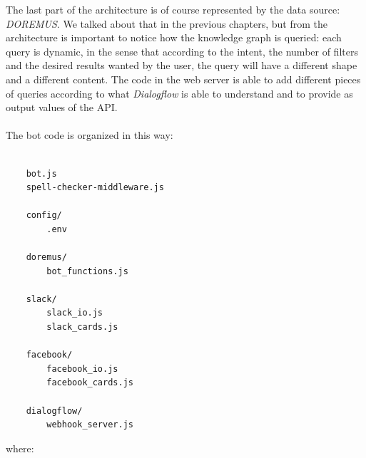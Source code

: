 \documentclass[a4paper,12pt]{report}
\begin{document}
	The last part of the architecture is of course represented by the data source: \textit{DOREMUS}. We talked about that in the previous chapters, but from the architecture is important to notice how the knowledge graph is queried: each query is dynamic, in the sense that according to the intent, the number of filters and the desired results wanted by the user, the query will have a different shape and a different content. The code in the web server is able to add different pieces of queries according to what \textit{Dialogflow} is able to understand and to provide as output values of the API.\\\\
	The bot code is organized in this way:
	\begin{lstlisting}
	
	bot.js
	spell-checker-middleware.js
	
	config/
		.env
	
	doremus/
		bot_functions.js
	
	slack/
		slack_io.js
		slack_cards.js
	
	facebook/
		facebook_io.js
		facebook_cards.js
		
	dialogflow/
		webhook_server.js
	\end{lstlisting}
	where:
\end{document}
